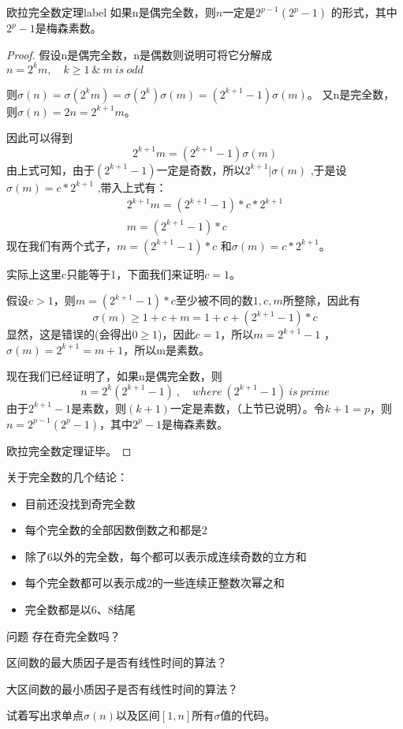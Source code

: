 \begin{theorem}{欧拉完全数定理}{label}
如果n是偶完全数，则$n$一定是$2^{p-1}(2^p-1)$ 的形式，其中$2^p-1$是梅森素数。
\end{theorem}

\begin{proof}
	假设n是偶完全数，n是偶数则说明可将它分解成$n=2^km,\quad k\ge 1 \ \&\ m\ is\ odd$
	
	则$\sigma(n)=\sigma(2^km)=\sigma(2^k)\sigma(m)=(2^{k+1}-1)\sigma(m)$。
	又n是完全数，则$\sigma(n)=2n=2^{k+1}m$。
	
	因此可以得到
	$$
	2^{k+1}m=(2^{k+1}-1)\sigma(m)
	$$
	由上式可知，由于$(2^{k+1}-1)$一定是奇数，所以$2^{k+1}| \sigma(m)$ ,于是设$\sigma(m)=c*2^{k+1}$ ,带入上式有：
	\begin{align*}
	2^{k+1}m=(2^{k+1}-1)*c*2^{k+1} \\
	m=(2^{k+1}-1)*c
	\end{align*}
	现在我们有两个式子，$m=(2^{k+1}-1)*c$ 和$\sigma(m)=c*2^{k+1}$。
	
	实际上这里c只能等于1，下面我们来证明$c=1$。
	
	假设$c>1$，则$m=(2^{k+1}-1)*c$至少被不同的数$1,c,m$所整除，因此有
	$$
	\sigma(m)\ge 1+c+m=1+c+(2^{k+1}-1)*c
	$$
	显然，这是错误的(会得出$0\ge 1$)，因此$c=1$，所以$m=2^{k+1}-1$  ，  $\sigma(m)=2^{k+1}=m+1$，所以m是素数。
	
	现在我们已经证明了，如果n是偶完全数，则
	$$
	n=2^k(2^{k+1}-1)\ ,\quad where \ (2^{k+1}-1)\ is \ prime
	$$
	由于$2^{k+1}-1$是素数，则$(k+1)$一定是素数，（上节已说明）。令$k+1=p$，则$n=2^{p-1}(2^p-1)$，其中$2^p-1$是梅森素数。
	
	欧拉完全数定理证毕。
\end{proof}

\vbox{}

\begin{note}
	关于完全数的几个结论：
	\begin{itemize}
		\item 目前还没找到奇完全数
		\item 每个完全数的全部因数倒数之和都是2
		\item 除了6以外的完全数，每个都可以表示成连续奇数的立方和
		\item 每个完全数都可以表示成2的一些连续正整数次幂之和
		\item 完全数都是以6、8结尾
	\end{itemize}
\end{note}

\vbox{}

\begin{custom}{问题}
	存在奇完全数吗？
\end{custom}

\vbox{}


\begin{problemset}
	\item 区间数的最大质因子是否有线性时间的算法？
	\item 大区间数的最小质因子是否有线性时间的算法？
	\item 试着写出求单点$\sigma(n)$以及区间$[1,n]$所有$\sigma$值的代码。
\end{problemset}